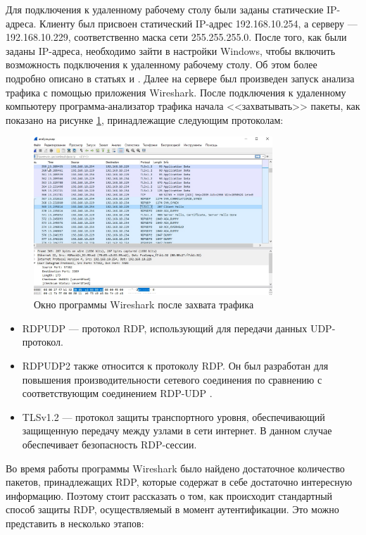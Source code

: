\documentclass[bachelor, och, coursework]{SCWorks}
\begin{document}
  Для подключения к удаленному рабочему столу были заданы статические IP-адреса. Клиенту был присвоен статический IP-адрес 192.168.10.254,
  а серверу --- 192.168.10.229, соответственно маска сети 255.255.255.0. После того, как были заданы IP-адреса, необходимо зайти в настройки
  Windows, чтобы включить возможность подключения к удаленному рабочему столу. Об этом более подробно описано
  в статьях \cite{userdp1} и \cite{userdp2}. Далее на сервере был произведен запуск анализа трафика с помощью приложения Wireshark.
  После подключения к удаленному компьютеру программа-анализатор трафика начала <<захватывать>> пакеты, как показано на рисунке \ref{wireshark1},
  принадлежащие следующим протоколам:
  
  \begin{figure}[H]
    \centering
    \includegraphics[width=0.8\textwidth]{photo/wireshark1.png}
    \caption{Окно программы Wireshark после захвата трафика}
    \label{wireshark1}
  \end{figure}

  \begin{itemize}
    \item RDPUDP --- протокол RDP, использующий для передачи данных UDP-протокол.
    \item RDPUDP2 также относится к протоколу RDP. Он был разработан для повышения производительности сетевого соединения по сравнению
    с соответствующим соединением RDP-UDP \cite{rdpudp}. 
    \item TLSv1.2 --- протокол защиты транспортного уровня, обеспечивающий защищенную передачу между узлами в сети интернет. В данном случае обеспечивает
    безопасность RDP-сессии.
  \end{itemize}
  
  Во время работы программы Wireshark было найдено достаточное количество пакетов, принадлежащих RDP, которые содержат в себе достаточно интересную
  информацию. Поэтому стоит рассказать о том, как происходит стандартный способ защиты RDP, осуществляемый в момент аутентификации.
  Это можно представить в несколько этапов:
\end{document}
